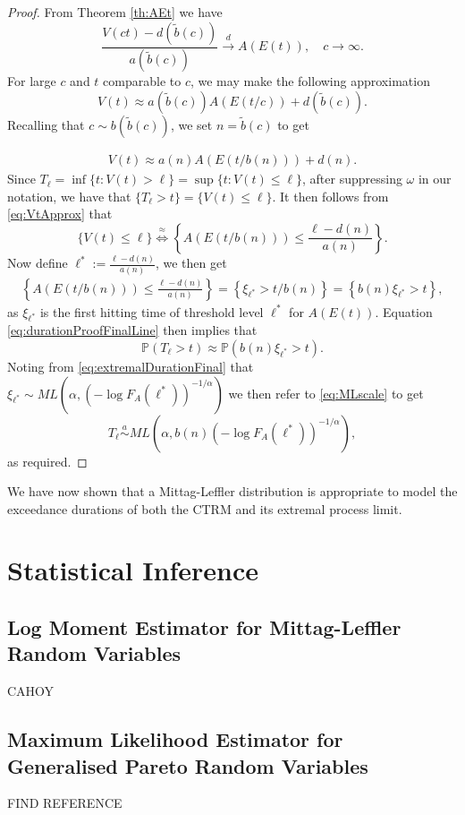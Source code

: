 \documentclass[honours,12pt]{unswthesis}
\newcommand{\PP}{\mathbb{P}}
\newcommand{\1}{\mathbf 1}
\newcommand{\cd}{\overset{d}{\longrightarrow}}
\numberwithin{equation}{section}
\theoremstyle{definition}
\theoremstyle{remark}
\begin{document}
\begin{proof}
From Theorem \ref{th:AEt} we have
\[
	\frac{V(ct)-d(\tilde{b}(c))}{a(\tilde{b}(c))} \cd A(E(t)), \quad c\to\infty.
\]
For large $c$ and $t$ comparable to $c$, we may make the following approximation
\[
	V(t) \approx a(\tilde b(c)) A(E(t/c)) + d(\tilde b(c)). 
\]
Recalling that $c \sim b(\tilde b(c))$, we set $n = \tilde b(c)$
to get

\begin{align}\label{eq:VtApprox}
	V(t) \approx a(n) A(E(t/b(n))) + d(n). 
\end{align}
Since $T_\ell=\inf\{t: V(t) > \ell\}=\sup\{t: V(t) \leq \ell\}$, after suppressing $\omega$ in our notation, we have that $\{T_\ell>t\}=\{V(t) \leq \ell\}$. It then follows from \ref{eq:VtApprox} that 
\[
	\{V(t) \leq \ell\} \stackrel{\approx}{\Longleftrightarrow} \left\{A(E(t/b(n))) \leq \frac{\ell - d(n)}{a(n)}\right\}.
\]
Now define  $\ell^* := \frac{\ell - d(n)}{a(n)}$, we then get
\begin{align}\label{eq:durationProofFinalLine}
\left\{A(E(t/b(n))) \leq \frac{\ell - d(n)}{a(n)}\right\}=\left\{\xi_{\ell^*} > t/b(n)\right\}=\left\{b(n)\xi_{\ell^*} > t\right\},
\end{align}
as $\xi_{\ell^*}$ is the first hitting time of threshold level $\ell^*$ for $A(E(t))$. Equation \ref{eq:durationProofFinalLine} then implies that
\[
	\PP(T_\ell>t)\approx\PP(b(n)\xi_{\ell^*} > t).
\]
Noting from \ref{eq:extremalDurationFinal} that $\xi_{\ell^*} \sim ML\left(\alpha,(-\log F_A({\ell^*}))^{-1/\alpha}\right)$ we then refer to \ref{eq:MLscale} to get
\[
	T_\ell\overset{a}{\sim}ML\left(\alpha, b(n)(-\log F_A(\ell^*))^{-1/\alpha}\right),
\]
as required.
\end{proof}
We have now shown that a Mittag-Leffler distribution is appropriate to model the exceedance durations of both the CTRM and its extremal process limit.

\chapter{Statistical Inference}
\section{Log Moment Estimator for Mittag-Leffler Random Variables}
CAHOY
\section{Maximum Likelihood Estimator for Generalised Pareto Random Variables}
FIND REFERENCE
\end{document}
